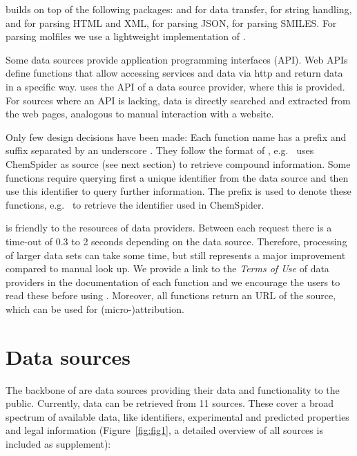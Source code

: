 \documentclass[article, shortnames]{jss}\usepackage[]{graphicx}\usepackage[]{color}
\begin{document}
 builds on top of the following  packages:
 \citep{lang_rcurl:_2015} and  \citep{wickham_httr} for data transfer,
 \citep{wickham_stringr:_2015} for string handling,
 \citep{wickham_xml2} and  \citep{wickham_rvest} for parsing HTML and XML,
 \citep{ooms_jsonlite_2014} for parsing JSON,
 \citep{guha_rcdk} for parsing SMILES.
For parsing molfiles we use a lightweight implementation of \citep{Grabner_Varmuza_Dehmer_2012}.

Some data sources provide application programming interfaces (API).
Web APIs define functions that allow accessing services and data via http and return data in a specific way.
 uses the API of a data source provider, where this is provided.
For sources where an API is lacking, data is directly searched and extracted from the web pages, analogous to manual interaction with a website.

Only few design decisions have been made:
Each function name has a prefix and suffix separated by an underscore \citep{Chamberlain_Szocs_2013}.
They follow the format of , e.g.\  uses ChemSpider as source (see next section) to retrieve compound information.
Some functions require querying first a unique identifier from the data source and then use this identifier to query further information.
The prefix  is used to denote these functions, e.g.\  to retrieve the identifier used in ChemSpider.

 is friendly to the resources of data providers. 
Between each request there is a time-out of 0.3 to 2 seconds depending on the data source. 
Therefore, processing of larger data sets can take some time, but still represents a major improvement compared to manual look up.
We provide a link to the \emph{Terms of Use} of data providers in the documentation of each function and we encourage the users to read these before using .
Moreover, all functions return an URL of the source, which can be used for \mbox{(micro-)attribution}.


\section[Data sources]{Data sources}
The backbone of  are data sources providing their data and functionality to the public.
Currently, data can be retrieved from 11 sources.
These cover a broad spectrum of available data, like identifiers, experimental and predicted properties and legal information (Figure~\ref{fig:fig1}, a detailed overview of all sources is included as supplement):
\end{document}
